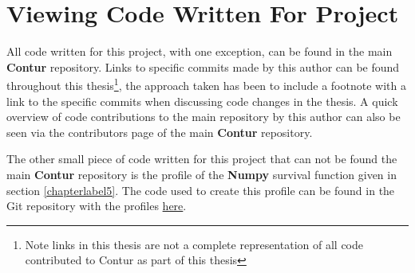 \chapter{Viewing Code Written For Project}
\label{appendixlabel2}
All code written for this project, with one exception, can be found in the main \textbf{Contur} repository\cite{contur_main}. Links to specific commits made by this author can be found throughout this thesis\footnote{Note links in this thesis are not a complete representation of all code contributed to Contur as part of this thesis}, the approach taken has been to include a footnote with a link to the specific commits when discussing code changes in the thesis. A quick overview of code contributions to the main repository by this author can also be seen via the contributors page of the main \textbf{Contur} repository\cite{contur_main}.

The other small piece of code written for this project that can not be found the main \textbf{Contur} repository is the profile of the \textbf{Numpy} survival function given in section \ref{chapterlabel5}. The code used to create this profile can be found in the Git repository with the profiles \href{https://github.com/SeanBrayUCL/contur_thesis/tree/main/profiling_code}{here}.
